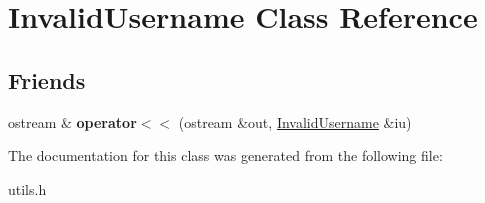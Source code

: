 \hypertarget{class_invalid_username}{}\section{Invalid\+Username Class Reference}
\label{class_invalid_username}
\subsection*{Friends}
\begin{DoxyCompactItemize}
\item 
\hypertarget{class_invalid_username_a2abb0b0d8c43a608378bb564bde84706}{}\label{class_invalid_username_a2abb0b0d8c43a608378bb564bde84706} 
ostream \& {\bfseries operator$<$$<$} (ostream \&out, \hyperlink{class_invalid_username}{Invalid\+Username} \&iu)
\end{DoxyCompactItemize}


The documentation for this class was generated from the following file\+:\begin{DoxyCompactItemize}
\item 
utils.\+h\end{DoxyCompactItemize}
